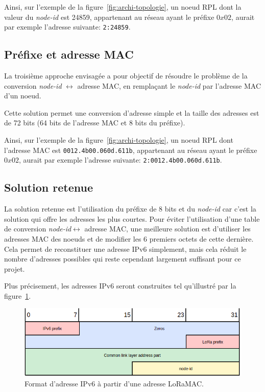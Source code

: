     Ainsi, sur l'exemple de la figure~\ref{fig:archi-topologie}, un noeud RPL dont la valeur du \textit{node-id} est 24859, appartenant au réseau ayant le préfixe $0x02$, aurait par exemple l'adresse suivante: \texttt{2:24859}.


\subsection*{Préfixe et adresse MAC}
    La troisième approche envisagée a pour objectif de résoudre le problème de la conversion \textit{node-id} $\leftrightarrow	$ adresse MAC, en remplaçant le \textit{node-id} par l'adresse MAC d'un noeud.

    Cette solution permet une conversion d'adresse simple et la taille des adresses est de 72 bits (64 bits de l'adresse MAC et 8 bits du préfixe).

    Ainsi, sur l'exemple de la figure~\ref{fig:archi-topologie}, un noeud RPL dont l'adresse MAC est \texttt{0012.4b00.060d.611b}, appartenant au réseau ayant le préfixe $0x02$, aurait par exemple l'adresse suivante: \texttt{2:0012.4b00.060d.611b}.

\subsection*{Solution retenue}
    La solution retenue est l'utilisation du préfixe de 8 bits et du \textit{node-id} car c'est la solution qui offre les adresses les plus courtes.    
    Pour éviter l'utilisation d'une table de conversion \textit{node-id}$\leftrightarrow$ adresse MAC, une meilleure solution est d'utiliser les adresses MAC des noeuds et de modifier les 6 premiers octets de cette dernière. Cela permet de reconstituer une adresse IPv6 simplement, mais cela réduit le nombre d'adresses possibles qui reste cependant largement suffisant pour ce projet.

    Plus précisement, les adresses IPv6 seront construites tel qu'illustré par la figure~\ref{fig:archi-address}.

    \begin{figure}[H]
        \centering
        \includegraphics[scale=0.4]{res/pictures/loraaddr-ipv6.drawio.png}
        \caption{Format d'adresse IPv6 à partir d'une adresse LoRaMAC.}
        \label{fig:archi-address}
    \end{figure}
    

